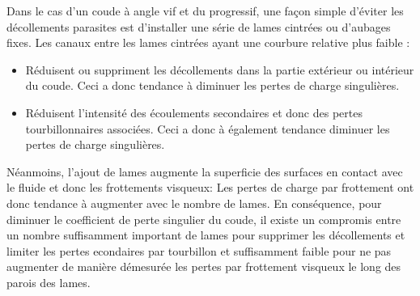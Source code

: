 Dans le cas d’un coude à angle vif et du progressif, une façon simple d’éviter les décollements parasites est d’installer une série de lames cintrées ou d’aubages fixes. Les canaux entre les lames cintrées ayant une courbure relative plus faible :
\begin{itemize}
\item  Réduisent ou suppriment les décollements dans la partie extérieur ou intérieur du coude. Ceci a donc tendance à diminuer les pertes de charge singulières.
\item Réduisent l’intensité des écoulements secondaires et donc des pertes tourbillonnaires associées. Ceci a donc à également tendance diminuer les pertes de charge singulières.
\end{itemize}

Néanmoins, l’ajout de lames augmente la superficie des surfaces en contact avec le fluide et donc les frottements visqueux: Les pertes de charge par frottement ont donc tendance à augmenter avec le nombre de lames. En conséquence, pour diminuer le coefficient de perte singulier du coude, il existe un compromis entre un nombre suffisamment important de lames pour supprimer les décollements et limiter les pertes  econdaires par tourbillon et suffisamment faible pour ne pas augmenter de manière démesurée les pertes par frottement visqueux le long des parois des lames.

